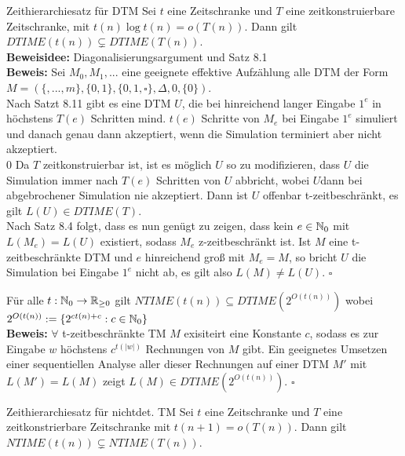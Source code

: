 \begin{satz}{Zeithierarchiesatz für DTM}
    Sei $t$ eine Zeitschranke und $T$ eine zeitkonstruierbare Zeitschranke, mit $t(n) \log t(n) = o(T(n))$. Dann gilt $DTIME(t(n)) \subsetneq DTIME(T(n))$.\\
    
    \textbf{Beweisidee: } Diagonalisierungsargument und Satz 8.1\\
    \textbf{Beweis:} Sei $M_0, M_1, ...$ eine geeignete effektive Aufzählung alle DTM der Form $M = (\{, ..., m\}, \{0, 1\}, \{0, 1, \square\}, \Delta, 0, \{0\})$.\\
    Nach Satzt 8.11 gibt es eine DTM $U$, die bei hinreichend langer Eingabe $1^e$ in höchstens $T(e)$ Schritten mind. $t(e)$ Schritte von $M_e$ bei Eingabe $1^e$ simuliert und danach genau dann akzeptiert, wenn die Simulation terminiert aber nicht akzeptiert.\\0
    Da $T$ zeitkonstruierbar ist, ist es möglich $U$ so zu modifizieren, dass $U$ die Simulation immer nach $T(e)$ Schritten von $U$ abbricht, wobei $U$dann bei abgebrochener Simulation nie akzeptiert. Dann ist $U$ offenbar t-zeitbeschränkt, es gilt $L(U) \in DTIME(T)$.\\
    Nach Satz 8.4 folgt, dass es nun genügt zu  zeigen, dass kein $e \in \mathbb{N}_0$ mit $L(M_e) = L(U)$ existiert, sodass $M_e$ z-zeitbeschränkt ist. Ist $M$ eine t-zeitbeschränkte DTM und $e$ hinreichend groß mit $M_e = M$, so bricht $U$ die Simulation bei Eingabe $1^e$ nicht ab, es gilt also $L(M) \neq L(U)$. \hspace*{\fill}$\square$
\end{satz}

\begin{prop}{}
    Für alle $t : \mathbb{N}_0 \to \mathbb{R}_{\geq 0}$ gilt $NTIME(t(n)) \subseteq DTIME(2^{O(t(n))})$ wobei $2^{O(t(n))} := \{2^{ct(n) +c} : c \in \mathbb{N}_0\}$\\
    
    \textbf{Beweis:} $\forall$ t-zeitbeschränkte TM $M$ exisiteirt eine Konstante $c$, sodass es zur Eingabe $w$ höchstens $c^{t(|w|)}$ Rechnungen von $M$ gibt. Ein geeignetes Umsetzen einer sequentiellen Analyse aller dieser Rechnungen auf einer DTM $M'$ mit $L(M') = L(M)$ zeigt $L(M) \in DTIME(2^{O(t(n))})$. \hspace*{\fill}$\square$ 
\end{prop}

\begin{satz}{Zeithierarchiesatz für nichtdet. TM}
    Sei $t$ eine Zeitschranke und $T$ eine zeitkonstrierbare Zeitschranke mit $t(n+1) = o(T(n))$. Dann gilt $NTIME(t(n)) \subsetneq NTIME(T(n))$.
\end{satz}